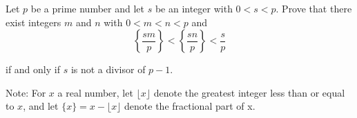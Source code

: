 Let $p$ be a prime number and let $s$ be an integer with $0 < s < p.$ Prove that there exist integers $m$ and $n$ with $0 < m < n < p$ and\[ \left \{\frac{sm}{p} \right\} < \left \{\frac{sn}{p} \right \} < \frac{s}{p}  \]

if and only if $s$ is not a divisor of $p-1$.

Note: For $x$ a real number, let $\lfloor x \rfloor$ denote the greatest integer less than or equal to $x$,  and let $\{x\} = x - \lfloor x \rfloor$ denote the fractional part of x.